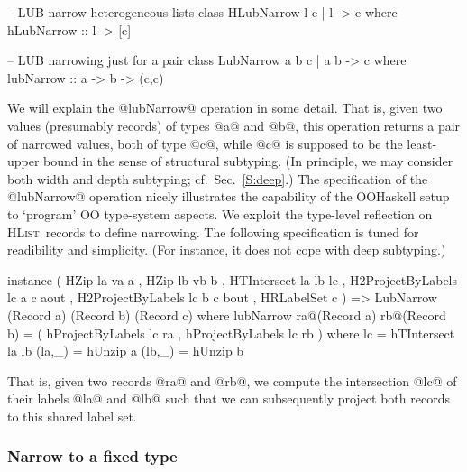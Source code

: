\documentclass{jfp}
\newcommand{\HList}{\textsc{HList}}
\begin{document}
\begin{code}
 -- LUB narrow heterogeneous lists
 class  HLubNarrow l e | l -> e
  where hLubNarrow :: l -> [e]
\end{code}

\begin{code}
 -- LUB narrowing just for a pair
 class  LubNarrow a b c | a b -> c
  where lubNarrow :: a -> b -> (c,c)
\end{code}

We will explain the @lubNarrow@ operation in some detail. That is,
given two values (presumably records) of types @a@ and @b@, this
operation returns a pair of narrowed values, both of type @c@, while
@c@ is supposed to be the least-upper bound in the sense of structural
subtyping. (In principle, we may consider both width and depth
subtyping; cf.\ Sec.~\ref{S:deep}.) The specification of the
@lubNarrow@ operation nicely illustrates the capability of the
OOHaskell setup to `program' OO type-system aspects. We exploit the
type-level reflection on \HList\ records to define narrowing. The
following specification is tuned for readibility and simplicity. (For
instance, it does not cope with deep subtyping.)

\begin{code}
 instance ( HZip la va a
          , HZip lb vb b
          , HTIntersect la lb lc
          , H2ProjectByLabels lc a c aout
          , H2ProjectByLabels lc b c bout
          , HRLabelSet c
          )
       => LubNarrow (Record a) (Record b) (Record c)
  where
   lubNarrow ra@(Record a) rb@(Record b) =
      ( hProjectByLabels lc ra
      , hProjectByLabels lc rb
      )
    where
     lc = hTIntersect la lb
     (la,_) = hUnzip a
     (lb,_) = hUnzip b
\end{code}

That is, given two records @ra@ and @rb@, we compute the intersection
@lc@ of their labels @la@ and @lb@ such that we can subsequently
project both records to this shared label set.






\subsubsection{Narrow to a fixed type}
\end{document}
